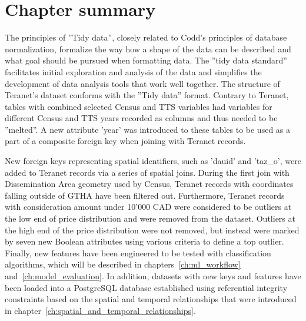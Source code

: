 \section{Chapter summary} \label{sec:data_preparation_summary}

The principles of ''Tidy data'', closely related to Codd's principles of database normalization, formalize the way how a shape of the data can be described and what goal should be pursued when formatting data.
The ''tidy data standard''  facilitates initial exploration and analysis of the data and simplifies the development of data analysis tools that work well together.
The structure of Teranet's dataset conforms with the ''Tidy data'' format.
Contrary to Teranet, tables with combined selected Census and TTS variables had variables for different Census and TTS years recorded as columns and thus needed to be ''melted''.
A new attribute 'year' was introduced to these tables to be used as a part of a composite foreign key when joining with Teranet records.

New foreign keys representing spatial identifiers, such as 'dauid' and 'taz\_o', were added to Teranet records via a series of spatial joins.
During the first join with Dissemination Area geometry used by Census, Teranet records with coordinates falling outside of GTHA have been filtered out.
Furthermore, Teranet records with consideration amount under 10'000 CAD were considered to be outliers at the low end of price distribution and were removed from the dataset.
Outliers at the high end of the price distribution were not removed, but instead were marked by seven new Boolean attributes using various criteria to define a top outlier.
Finally, new features have been engineered to be tested with classification algorithms, which will be described in chapters~\ref{ch:ml_workflow} and~\ref{ch:model_evaluation}.
In addition, datasets with new keys and features have been loaded into a PostgreSQL database established using referential integrity constraints based on the spatial and temporal relationships that were introduced in chapter~\ref{ch:spatial_and_temporal_relationships}.


